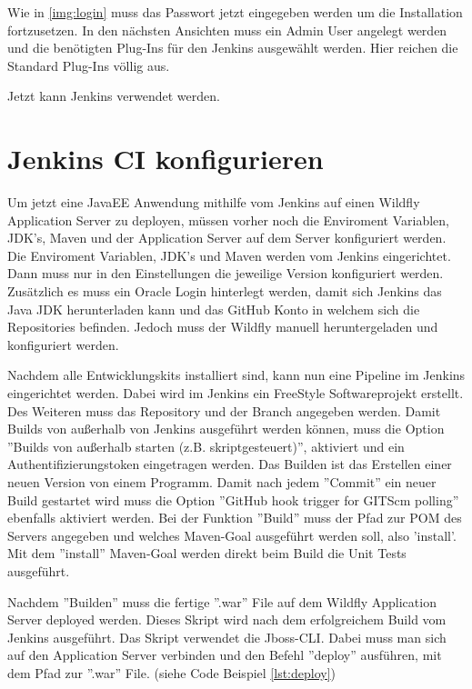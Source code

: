 Wie in \ref{img:login} muss das Passwort jetzt eingegeben werden um die Installation fortzusetzen. In den nächsten Ansichten muss ein Admin User angelegt werden und die benötigten Plug-Ins für den Jenkins ausgewählt werden. Hier reichen die Standard Plug-Ins völlig aus.

Jetzt kann Jenkins verwendet werden.

\section{Jenkins CI konfigurieren}
\label{sec:jenkinsconfiguration}
Um jetzt eine JavaEE Anwendung mithilfe vom Jenkins auf einen Wildfly Application Server zu deployen, müssen vorher noch die Enviroment Variablen, JDK's, Maven und der Application Server auf dem Server konfiguriert werden. Die Enviroment Variablen, JDK's und Maven werden vom Jenkins eingerichtet. Dann muss nur in den Einstellungen die jeweilige Version konfiguriert werden. Zusätzlich es muss ein Oracle Login hinterlegt werden, damit sich Jenkins das Java JDK herunterladen kann und das GitHub Konto in welchem sich die Repositories befinden. Jedoch muss der Wildfly manuell heruntergeladen und konfiguriert werden.

Nachdem alle Entwicklungskits installiert sind, kann nun eine Pipeline im Jenkins eingerichtet werden. Dabei wird im Jenkins ein FreeStyle Softwareprojekt erstellt. Des Weiteren muss das Repository und der Branch angegeben werden. Damit Builds von außerhalb von Jenkins ausgeführt werden können, muss die Option ''Builds von außerhalb starten (z.B. skriptgesteuert)'', aktiviert und ein Authentifizierungstoken eingetragen werden. Das Builden ist das Erstellen einer neuen Version von einem Programm. Damit nach jedem ''Commit'' ein neuer Build gestartet wird muss die Option ''GitHub hook trigger for GITScm polling'' ebenfalls aktiviert werden. Bei der Funktion ''Build'' muss der Pfad zur POM des Servers angegeben und welches Maven-Goal ausgeführt werden soll, also 'install'. Mit dem ''install'' Maven-Goal werden direkt beim Build die Unit Tests ausgeführt.

Nachdem ''Builden'' muss die fertige ''.war'' File auf dem Wildfly Application Server deployed werden. Dieses Skript wird nach dem erfolgreichem Build vom Jenkins ausgeführt. Das Skript verwendet die Jboss-CLI. Dabei muss man sich auf den Application Server verbinden und den Befehl ''deploy'' ausführen, mit dem Pfad zur ''.war'' File. (siehe Code Beispiel \ref{lst:deploy}) 

